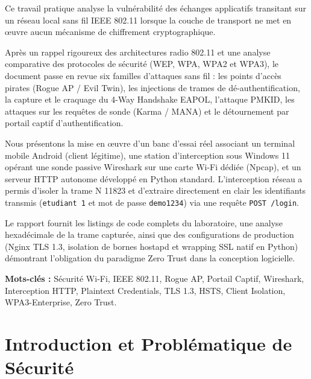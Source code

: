 \documentclass[a4paper,11pt]{article}
\begin{document}
\thispagestyle{empty}
\vspace*{0.8cm}
\begin{tcolorbox}[colback=lightbg,colframe=bordergray,arc=3mm,title=\textbf{\color{navy}Résumé Exécutif}]
Ce travail pratique analyse la vulnérabilité des échanges applicatifs transitant sur un réseau local sans fil IEEE 802.11 lorsque la couche de transport ne met en œuvre aucun mécanisme de chiffrement cryptographique. 

Après un rappel rigoureux des architectures radio 802.11 et une analyse comparative des protocoles de sécurité (WEP, WPA, WPA2 et WPA3), le document passe en revue six familles d'attaques sans fil : les points d'accès pirates (Rogue AP / Evil Twin), les injections de trames de dé-authentification, la capture et le craquage du 4-Way Handshake EAPOL, l'attaque PMKID, les attaques sur les requêtes de sonde (Karma / MANA) et le détournement par portail captif d'authentification.

Nous présentons la mise en œuvre d'un banc d'essai réel associant un terminal mobile Android (client légitime), une station d'interception sous Windows 11 opérant une sonde passive Wireshark sur une carte Wi-Fi dédiée (Npcap), et un serveur HTTP autonome développé en Python standard. L'interception réseau a permis d'isoler la trame N 11823 et d'extraire directement en clair les identifiants transmis (\texttt{etudiant 1} et mot de passe \texttt{demo1234}) via une requête \texttt{POST /login}.

Le rapport fournit les listings de code complets du laboratoire, une analyse hexadécimale de la trame capturée, ainsi que des configurations de production (Nginx TLS 1.3, isolation de bornes hostapd et wrapping SSL natif en Python) démontrant l'obligation du paradigme Zero Trust dans la conception logicielle.
\end{tcolorbox}

\vspace{0.8cm}
\noindent\textbf{Mots-clés :} Sécurité Wi-Fi, IEEE 802.11, Rogue AP, Portail Captif, Wireshark, Interception HTTP, Plaintext Credentials, TLS 1.3, HSTS, Client Isolation, WPA3-Enterprise, Zero Trust.

\newpage

\tableofcontents
\newpage

\section{Introduction et Problématique de Sécurité}
\end{document}
